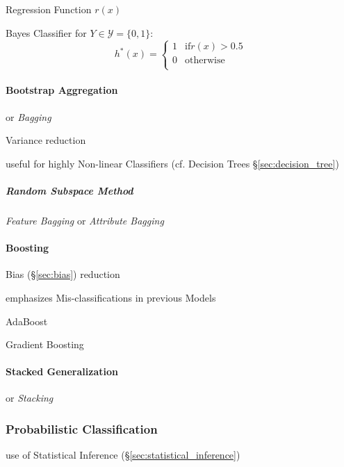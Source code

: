 Regression Function $r(x)$

Bayes Classifier for $Y \in \mathcal{Y} = \{0, 1\}$:
\[
  h^*(x) = \begin{cases}
    1 & \text{if} r(x) > 0.5 \\
    0 & \text{otherwise} \\
  \end{cases}
\]



\paragraph{Bootstrap Aggregation}\label{sec:bootstrap_aggregation}\hfill

or \emph{Bagging}

Variance reduction

useful for highly Non-linear Classifiers (cf. Decision Trees
\S\ref{sec:decision_tree})



\subparagraph{Random Subspace Method}\label{sec:random_subspace_method}\hfill

\emph{Feature Bagging} or \emph{Attribute Bagging}



\paragraph{Boosting}\label{sec:boosting}\hfill

Bias (\S\ref{sec:bias}) reduction

emphasizes Mis-classifications in previous Models

AdaBoost

Gradient Boosting



\paragraph{Stacked Generalization}\label{sec:stacked_generalization}\hfill

or \emph{Stacking}



\subsubsection{Probabilistic Classification}
\label{sec:probabilistic_classification}

use of Statistical Inference (\S\ref{sec:statistical_inference})



